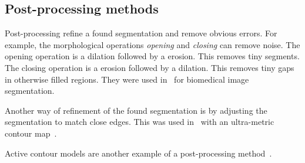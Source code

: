 
\subsection{Post-processing methods}\label{subsec:post-processing-methods}%
Post-processing refine a found segmentation and remove obvious
errors. For example, the morphological operations \textit{opening} and
\textit{closing} can remove noise. The opening operation is a dilation followed
by a erosion. This removes tiny segments. The closing operation is a erosion
followed by a dilation. This removes tiny gaps in otherwise filled regions.
They were used in~\cite{chen1998image} for biomedical image segmentation.

Another way of refinement of the found segmentation is by adjusting the
segmentation to match close edges. This was used in~\cite{brox2011object} with
an ultra-metric contour map~\cite{arbelaez2009contours}.

Active contour models are another example of a post-processing
method~\cite{kass1988snakes}.
